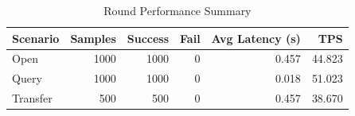 \begin{table}
\caption{Round Performance Summary}
\label{tab:round_perf}
\begin{tabular}{lrrrrr}
\toprule
Scenario & Samples & Success & Fail & Avg Latency (s) & TPS \\
\midrule
Open & 1000 & 1000 & 0 & 0.457 & 44.823 \\
Query & 1000 & 1000 & 0 & 0.018 & 51.023 \\
Transfer & 500 & 500 & 0 & 0.457 & 38.670 \\
\bottomrule
\end{tabular}
\end{table}
